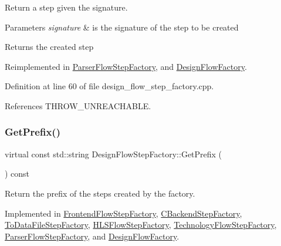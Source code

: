 Return a step given the signature. 


\begin{DoxyParams}{Parameters}
{\em signature} & is the signature of the step to be created \\
\hline
\end{DoxyParams}
\begin{DoxyReturn}{Returns}
the created step 
\end{DoxyReturn}


Reimplemented in \hyperlink{classParserFlowStepFactory_a694b513efdd4a039212c4ce072ceb8f4}{Parser\+Flow\+Step\+Factory}, and \hyperlink{classDesignFlowFactory_a4dd446831a1e7d6f5af137beff1d4cab}{Design\+Flow\+Factory}.



Definition at line 60 of file design\+\_\+flow\+\_\+step\+\_\+factory.\+cpp.



References T\+H\+R\+O\+W\+\_\+\+U\+N\+R\+E\+A\+C\+H\+A\+B\+LE.

\mbox{\label{classDesignFlowStepFactory_a52abfc00c170b5a63e84431b75eb698e}} 
\subsubsection{\texorpdfstring{Get\+Prefix()}{GetPrefix()}}
{\footnotesize\ttfamily virtual const std\+::string Design\+Flow\+Step\+Factory\+::\+Get\+Prefix (\begin{DoxyParamCaption}{ }\end{DoxyParamCaption}) const\hspace{0.3cm}{\ttfamily [pure virtual]}}



Return the prefix of the steps created by the factory. 



Implemented in \hyperlink{classFrontendFlowStepFactory_af3ccb203f94d1774361a9095694ab11f}{Frontend\+Flow\+Step\+Factory}, \hyperlink{classCBackendStepFactory_acfa5b90eed2d622eb52ab9b3864d9071}{C\+Backend\+Step\+Factory}, \hyperlink{classToDataFileStepFactory_abf32d2fdf2cbc501b3d1951f0fb55e93}{To\+Data\+File\+Step\+Factory}, \hyperlink{classHLSFlowStepFactory_a84c60dc2d5dfbeccd7c631861a5bb93f}{H\+L\+S\+Flow\+Step\+Factory}, \hyperlink{classTechnologyFlowStepFactory_a072cf55c638fc7b1940fa4521b38b9f2}{Technology\+Flow\+Step\+Factory}, \hyperlink{classParserFlowStepFactory_adc4d59c9d264adc657113b5991cdf47f}{Parser\+Flow\+Step\+Factory}, and \hyperlink{classDesignFlowFactory_a926debf95513064610a97e5240f5c530}{Design\+Flow\+Factory}.



